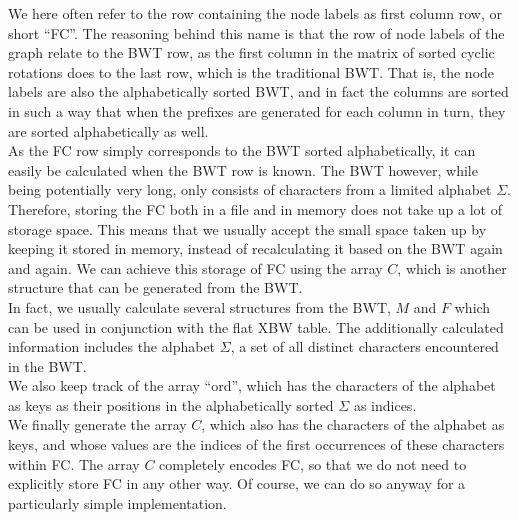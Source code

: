 \documentclass[a4paper,12pt,twoside,BCOR=10mm]{scrbook}
\begin{document}
We here often refer to the row containing the node labels as first column row, or short “FC”. 
The reasoning behind this name is that the row of node labels of the graph relate to the BWT row, 
as the first column in the matrix of sorted cyclic rotations does to the last row, which is the traditional BWT. 
That is, the node labels are also the alphabetically sorted BWT, and in fact the columns are sorted in such a 
way that when the prefixes are generated for each column in turn, they are sorted alphabetically as well. \\
As the FC row simply corresponds to the BWT sorted alphabetically, it can easily be calculated 
when the BWT row is known. The BWT however, while being potentially very 
long, only consists of characters from a limited alphabet $ \Sigma $. 
Therefore, storing the FC both in a file and in memory does not take up a lot of storage space. 
This means that we usually accept the small space taken up by keeping it stored in memory, 
instead of recalculating it based on the BWT again and again. 
We can achieve this storage of FC using the array $ C $, which is another structure that can be generated 
from the BWT. \\
In fact, we usually calculate several structures from the BWT, $ M $ and $ F $ which 
can be used in conjunction with the flat XBW table. 
The additionally calculated information includes 
the alphabet $ \Sigma $, a set of all distinct characters encountered in the BWT. \\
We also keep track of the array “ord”, which has the characters of the alphabet as keys as their 
positions in the alphabetically sorted $ \Sigma $ as indices. \\
We finally generate the array $ C $, which also has the characters of the alphabet as keys, 
and whose values are the indices of the first occurrences of these characters within FC. 
The array $ C $ completely encodes FC, so that we do not need to explicitly store FC in any other way. 
Of course, we can do so anyway for a particularly simple implementation.
\end{document}
